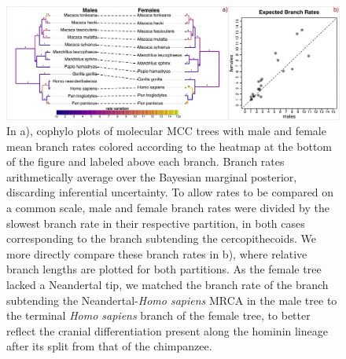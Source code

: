 \begin{figure}[h]
\centering
\includegraphics[width=160mm]{figures/harvati_figure4_final.pdf}
\caption[Rate Variation in Catarrhine Cranial Evolution]{In a), cophylo plots of molecular MCC trees with male and female mean branch rates colored according to the heatmap at the bottom of the figure and labeled above each branch. Branch rates arithmetically average over the Bayesian marginal posterior, discarding inferential uncertainty. To allow rates to be compared on a common scale, male and female branch rates were divided by the slowest branch rate in their respective partition, in both cases corresponding to the branch subtending the cercopithecoids. We more directly compare these branch rates in b), where relative branch lengths are plotted for both partitions. As the female tree lacked a Neandertal tip, we matched the branch rate of the branch subtending the Neandertal-\textit{Homo sapiens} MRCA in the male tree to the terminal \textit{Homo sapiens} branch of the female tree, to better reflect the cranial differentiation present along the hominin lineage after its split from that of the chimpanzee. \label{overflow}
\label{fig:harvatiFigure4}}
\end{figure}

